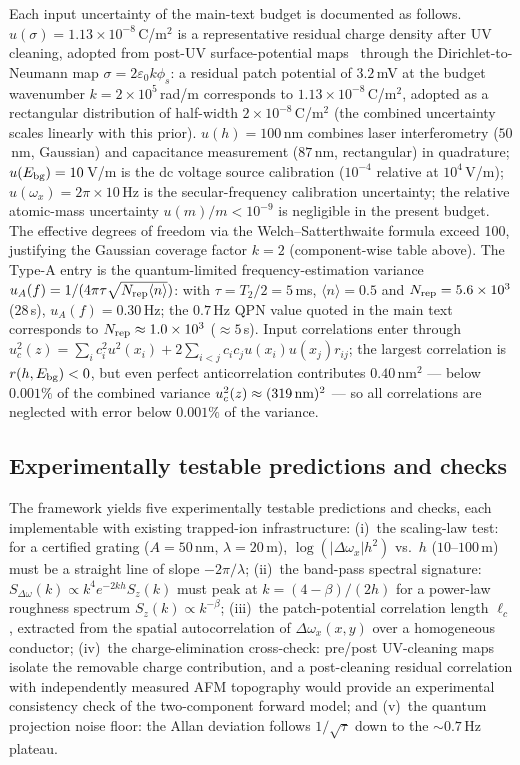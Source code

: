 \documentclass[12pt,a4paper]{article}
\begin{document}
Each input uncertainty of the main-text budget is documented as follows.
$u(\sigma)=1.13\times10^{-8}$\,C/m$^2$ is a representative residual
charge density after UV cleaning, adopted from post-UV surface-potential
maps~\cite{ziomba2025uv} through the Dirichlet-to-Neumann map
$\sigma=2\varepsilon_0k\phi_s$: a residual patch potential of $3.2$\,mV
at the budget wavenumber $k=2\times10^5$\,rad/m corresponds to
$1.13\times10^{-8}$\,C/m$^2$, adopted as a rectangular distribution of
half-width $2\times10^{-8}$\,C/m$^2$ (the combined uncertainty scales
linearly with this prior).  $u(h)=100$\,nm combines laser interferometry
($50$\,nm, Gaussian) and capacitance measurement ($87$\,nm, rectangular)
in quadrature; $u(E_{\rm bg})=10$\,V/m is the dc voltage source
calibration ($10^{-4}$ relative at $10^4$\,V/m);
$u(\omega_x)=2\pi\times10$\,Hz is the secular-frequency calibration
uncertainty; the relative atomic-mass uncertainty $u(m)/m<10^{-9}$ is
negligible in the present budget.  The effective degrees of freedom via the
Welch--Satterthwaite formula exceed 100, justifying the Gaussian coverage
factor $k=2$ (component-wise table above).  The Type-A entry is the
quantum-limited frequency-estimation variance
$u_A(f)=1/(4\pi\tau\sqrt{N_{\rm rep}\langle n\rangle})$: with
$\tau=T_2/2=5$\,ms, $\langle n\rangle=0.5$ and $N_{\rm rep}=5.6\times10^3$
($28$\,s), $u_A(f)=0.30$\,Hz; the $0.7$\,Hz QPN value quoted in the main
text corresponds to $N_{\rm rep}\approx1.0\times10^3$ ($\approx5$\,s).
Input correlations enter through
$u_c^2(z)=\sum_ic_i^2u^2(x_i)+2\sum_{i<j}c_ic_ju(x_i)u(x_j)r_{ij}$;
the largest correlation is $r(h,E_{\rm bg})<0$, but even perfect
anticorrelation contributes $0.40$\,nm$^2$ --- below $0.001\%$ of the
combined variance $u_c^2(z)\approx(319\,\textup{nm})^2$ --- so all
correlations are neglected with error below $0.001\%$ of the variance.

\subsection{Experimentally testable predictions and checks}

The framework yields five experimentally testable predictions and checks,
each implementable with existing trapped-ion infrastructure:
(i)~the scaling-law test: for a certified grating ($A=50$\,nm,
$\lambda=20$\,\textmu m), $\log(|\Delta\omega_x|h^2)$ vs.\ $h$
($10$--$100$\,\textmu m) must be a straight line of slope $-2\pi/\lambda$;
(ii)~the band-pass spectral signature:
$S_{\Delta\omega}(k)\propto k^4e^{-2kh}S_z(k)$ must peak at
$k=(4-\beta)/(2h)$ for a power-law roughness spectrum
$S_z(k)\propto k^{-\beta}$;
(iii)~the patch-potential correlation length $\ell_c$, extracted from the
spatial autocorrelation of $\Delta\omega_x(x,y)$ over a homogeneous
conductor;
(iv)~the charge-elimination cross-check: pre/post UV-cleaning maps isolate
the removable charge contribution, and a post-cleaning residual
correlation with independently measured AFM topography would provide an
experimental consistency check of the two-component forward model; and
(v)~the quantum projection noise floor: the Allan deviation follows
$1/\sqrt{\tau}$ down to the ${\sim}0.7$\,Hz plateau.
\end{document}
